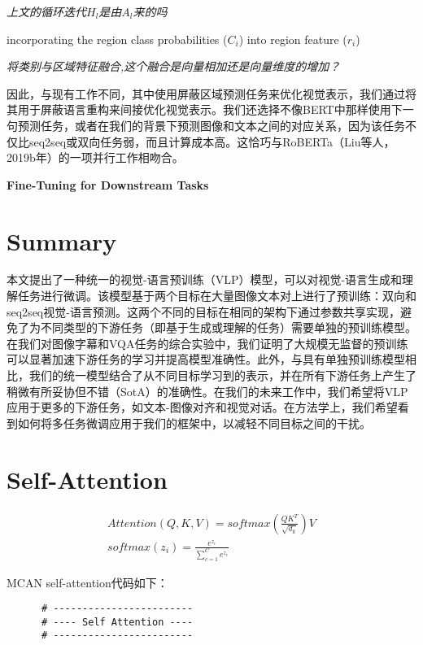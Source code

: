 \documentclass{article}
\begin{document}
\begin{sloppypar}
      \textit{上文的循环迭代$H_l$是由$A_l$来的吗}

      incorporating the region class probabilities ($C_i$) into region feature ($r_i$)

      \textit{将类别与区域特征融合,这个融合是向量相加还是向量维度的增加？}

      因此，与现有工作不同，其中使用屏蔽区域预测任务来优化视觉表示，我们通过将其用于屏蔽语言重构来间接优化视觉表示。我们还选择不像BERT中那样使用下一句预测任务，或者在我们的背景下预测图像和文本之间的对应关系，因为该任务不仅比seq2seq或双向任务弱，而且计算成本高。这恰巧与RoBERTa（Liu等人，2019b年）的一项并行工作相吻合。


      \centerline{\textbf{Fine-Tuning for Downstream Tasks}}



      \section{Summary}

      本文提出了一种统一的视觉-语言预训练（VLP）模型，可以对视觉-语言生成和理解任务进行微调。该模型基于两个目标在大量图像文本对上进行了预训练：双向和seq2seq视觉-语言预测。这两个不同的目标在相同的架构下通过参数共享实现，避免了为不同类型的下游任务（即基于生成或理解的任务）需要单独的预训练模型。在我们对图像字幕和VQA任务的综合实验中，我们证明了大规模无监督的预训练可以显著加速下游任务的学习并提高模型准确性。此外，与具有单独预训练模型相比，我们的统一模型结合了从不同目标学习到的表示，并在所有下游任务上产生了稍微有所妥协但不错（SotA）的准确性。在我们的未来工作中，我们希望将VLP应用于更多的下游任务，如文本-图像对齐和视觉对话。在方法学上，我们希望看到如何将多任务微调应用于我们的框架中，以减轻不同目标之间的干扰。

      \section{Self-Attention}

      \begin{gather}
            Attention(Q,K,V)=softmax(\frac{QK^T}{\sqrt{d_k}})V\\
            softmax(z_i)=\frac{e^{z_i}}{\sum_{c=1}^C e^{z_c}}
      \end{gather}

      MCAN self-attention代码如下：
      \begin{lstlisting}
      # ------------------------
      # ---- Self Attention ----
      # ------------------------


\end{lstlisting}
\end{sloppypar}
\end{document}
